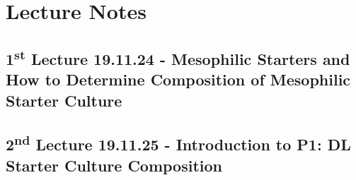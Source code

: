 \chapter{Lecture Notes}
\setlength{\headheight}{12.71342pt}
\addtolength{\topmargin}{-0.71342pt}

\section{1\texorpdfstring{\textsuperscript{st}}{st} Lecture 19.11.24 - Mesophilic Starters and How to Determine Composition of Mesophilic Starter Culture}

\section{2\texorpdfstring{\textsuperscript{nd}}{nd} Lecture 19.11.25 - Introduction to P1: DL Starter Culture Composition}



